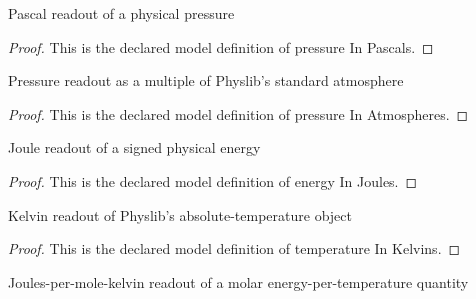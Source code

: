 \begin{definition}
  \label{def:physics:phyx-mini-0413:phyxminiproblems-problemphyxmini0413-pressureinpascals}
  Pascal readout of a physical pressure
\end{definition}
\begin{proof}
  This is the declared model definition of pressure In Pascals.
\end{proof}
\begin{definition}
  \label{def:physics:phyx-mini-0413:phyxminiproblems-problemphyxmini0413-pressureinatmospheres}
  Pressure readout as a multiple of Physlib's standard atmosphere
\end{definition}
\begin{proof}
  This is the declared model definition of pressure In Atmospheres.
\end{proof}
\begin{definition}
  \label{def:physics:phyx-mini-0413:phyxminiproblems-problemphyxmini0413-energyinjoules}
  Joule readout of a signed physical energy
\end{definition}
\begin{proof}
  This is the declared model definition of energy In Joules.
\end{proof}
\begin{definition}
  \label{def:physics:phyx-mini-0413:phyxminiproblems-problemphyxmini0413-temperatureinkelvins}
  Kelvin readout of Physlib's absolute-temperature object
\end{definition}
\begin{proof}
  This is the declared model definition of temperature In Kelvins.
\end{proof}
\begin{definition}
  \label{def:physics:phyx-mini-0413:phyxminiproblems-problemphyxmini0413-molarenergyperkelvininsi}
  Joules-per-mole-kelvin readout of a molar energy-per-temperature quantity
\end{definition}
